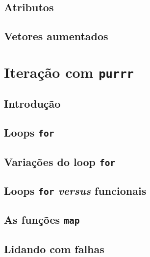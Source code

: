 \documentclass[
]{latex/krantz}
\theoremstyle{definition}
\theoremstyle{definition}
\theoremstyle{definition}
\theoremstyle{definition}
\theoremstyle{remark}
\begin{document}
\hypertarget{atributos}{%
\section{Atributos}\label{atributos}}

\hypertarget{vetores-aumentados}{%
\section{Vetores aumentados}\label{vetores-aumentados}}

\hypertarget{iterauxe7uxe3o-com-purrr}{%
\chapter{\texorpdfstring{Iteração com \texttt{purrr}}{Iteração com purrr}}\label{iterauxe7uxe3o-com-purrr}}

\hypertarget{introduuxe7uxe3o-13}{%
\section{Introdução}\label{introduuxe7uxe3o-13}}

\hypertarget{loops-for}{%
\section{\texorpdfstring{Loops \texttt{for}}{Loops for}}\label{loops-for}}

\hypertarget{variauxe7uxf5es-do-loop-for}{%
\section{\texorpdfstring{Variações do loop \texttt{for}}{Variações do loop for}}\label{variauxe7uxf5es-do-loop-for}}

\hypertarget{loops-for-versus-funcionais}{%
\section{\texorpdfstring{Loops \texttt{for} \emph{versus} funcionais}{Loops for versus funcionais}}\label{loops-for-versus-funcionais}}

\hypertarget{as-funuxe7uxf5es-map}{%
\section{\texorpdfstring{As funções \texttt{map}}{As funções map}}\label{as-funuxe7uxf5es-map}}

\hypertarget{lidando-com-falhas}{%
\section{Lidando com falhas}\label{lidando-com-falhas}}
\end{document}
